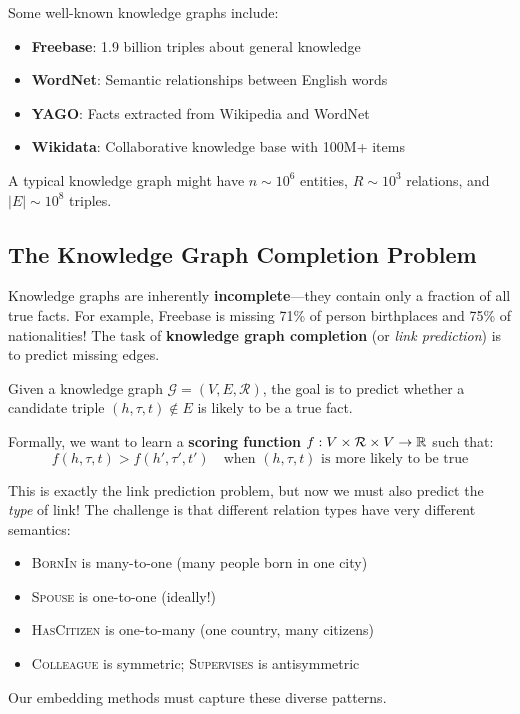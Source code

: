 \begin{notechapter}
\begin{example}
Some well-known knowledge graphs include:
\begin{itemize}
    \item \textbf{Freebase}: 1.9 billion triples about general knowledge
    \item \textbf{WordNet}: Semantic relationships between English words
    \item \textbf{YAGO}: Facts extracted from Wikipedia and WordNet
    \item \textbf{Wikidata}: Collaborative knowledge base with 100M+ items
\end{itemize}
A typical knowledge graph might have $n \sim 10^6$ entities, $R \sim 10^3$ relations, and $|E| \sim 10^8$ triples.
\end{example}

\subsection{The Knowledge Graph Completion Problem}

\begin{whybox}
Knowledge graphs are inherently \textbf{incomplete}---they contain only a fraction of all true facts. For example, Freebase is missing 71\% of person birthplaces and 75\% of nationalities! The task of \textbf{knowledge graph completion} (or \emph{link prediction}) is to predict missing edges.
\end{whybox}

\begin{definition}
Given a knowledge graph $\mathcal{G} = (V, E, \mathcal{R})$, the goal is to predict whether a candidate triple $(h, \tau, t) \notin E$ is likely to be a true fact.

Formally, we want to learn a \textbf{scoring function} $f: V \times \mathcal{R} \times V \to \mathbb{R}$ such that:
\[
f(h, \tau, t) > f(h', \tau', t') \quad \text{when } (h, \tau, t) \text{ is more likely to be true}
\]
\end{definition}

\begin{intuition}
This is exactly the link prediction problem, but now we must also predict the \emph{type} of link! The challenge is that different relation types have very different semantics:
\begin{itemize}
    \item \textsc{BornIn} is many-to-one (many people born in one city)
    \item \textsc{Spouse} is one-to-one (ideally!)
    \item \textsc{HasCitizen} is one-to-many (one country, many citizens)
    \item \textsc{Colleague} is symmetric; \textsc{Supervises} is antisymmetric
\end{itemize}
Our embedding methods must capture these diverse patterns.
\end{intuition}


\end{notechapter}
